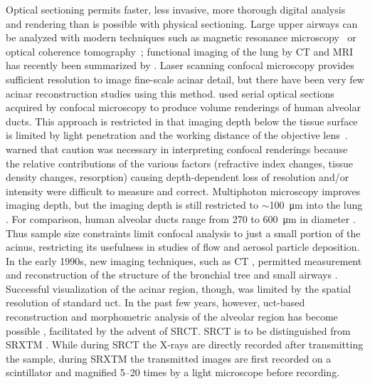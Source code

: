 Optical sectioning permits faster, less invasive, more thorough digital analysis and \threed rendering than is possible with physical sectioning. Large upper airways can be analyzed with modern techniques such as magnetic resonance microscopy~\cite{Hoffman1990,Sundaramoorthy1995} or optical coherence tomography~\cite{Hanna2005}; functional imaging of the lung by \ac{CT} and \ac{MRI} has recently been summarized by \citet{VanBeek2008}. Laser scanning confocal microscopy provides sufficient resolution to image fine-scale acinar detail, but there have been very few \threed acinar reconstruction studies using this method. \citet{Cookson1993} used serial optical sections acquired by confocal microscopy to produce \threed volume renderings of human alveolar ducts. This approach is restricted in that imaging depth below the tissue surface is limited by light penetration and the working distance of the objective lens~\cite{Bonse1996}. \citet{Cookson1993} warned that caution was necessary in interpreting confocal \threed renderings because the relative contributions of the various factors (refractive index changes, tissue density changes, resorption) causing depth-dependent loss of resolution and/or intensity were difficult to measure and correct. Multiphoton microscopy improves imaging depth, but the imaging depth is still restricted to $\sim$\SI{100}{\micro\meter} into the lung \cite{Pena2007}. For comparison, human alveolar ducts range from 270 to \SI{600}{\micro\meter} in diameter \cite{Whimster1970}. Thus sample size constraints limit confocal analysis to just a small portion of the acinus, restricting its usefulness in studies of flow and aerosol particle deposition. In the early 1990s, new imaging techniques, such as \ac{CT} \cite{Brown1991,Mcnamara1992}, permitted measurement and reconstruction of the \threed structure of the bronchial tree and small airways \cite{Aykac2003,Higgins1998,Park1998,Reinhardt1997,Sauret2002,Sera2003,Wood1995,Wood1995a}. Successful visualization of the acinar region, though, was limited by the spatial resolution of standard \ac{uct}. In the past few years, however, \ac{uct}-based \threed reconstruction and morphometric analysis of the alveolar region has become possible \cite{Langheinrich2004,Litzlbauer2006,Watz2005}, facilitated by the advent of \ac{SRCT}. \ac{SRCT} is to be distinguished from \ac{SRXTM} \cite{Schittny2008,Stampanoni2002,Stampanoni2007}. While during SRCT the X-rays are directly recorded after transmitting the sample, during \ac{SRXTM} the transmitted images are first recorded on a scintillator and magnified 5--20 times by a light microscope before recording.

